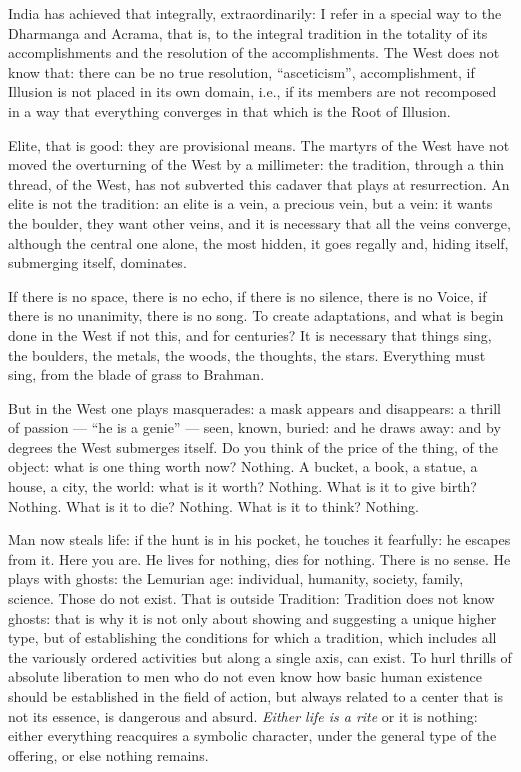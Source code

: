 India has achieved that integrally, extraordinarily: I refer in a special way to the Dharmanga and Acrama, that is, to the integral tradition in the totality of its accomplishments and the resolution of the accomplishments. The West does not know that: there can be no true resolution, ``asceticism'', accomplishment, if Illusion is not placed in its own domain, i.e., if its members are not recomposed in a way that everything converges in that which is the Root of Illusion.

Elite, that is good: they are provisional means. The martyrs of the West have not moved the overturning of the West by a millimeter: the tradition, through a thin thread, of the West, has not subverted this cadaver that plays at resurrection. An elite is not the tradition: an elite is a vein, a precious vein, but a vein: it wants the boulder, they want other veins, and it is necessary that all the veins converge, although the central one alone, the most hidden, it goes regally and, hiding itself, submerging itself, dominates.

If there is no space, there is no echo, if there is no silence, there is no Voice, if there is no unanimity, there is no song. To create adaptations, and what is begin done in the West if not this, and for centuries? It is necessary that things sing, the boulders, the metals, the woods, the thoughts, the stars. Everything must sing, from the blade of grass to Brahman.

But in the West one plays masquerades: a mask appears and disappears: a thrill of passion --- ``he is a genie'' --- seen, known, buried: and he draws away: and by degrees the West submerges itself. Do you think of the price of the thing, of the object: what is one thing worth now? Nothing. A bucket, a book, a statue, a house, a city, the world: what is it worth? Nothing. What is it to give birth? Nothing. What is it to die? Nothing. What is it to think? Nothing.

Man now steals life: if the hunt is in his pocket, he touches it fearfully: he escapes from it. Here you are. He lives for nothing, dies for nothing. There is no sense. He plays with ghosts: the Lemurian age: individual, humanity, society, family, science. Those do not exist. That is outside Tradition: Tradition does not know ghosts: that is why it is not only about showing and suggesting a unique higher type, but of establishing the conditions for which a tradition, which includes all the variously ordered activities but along a single axis, can exist. To hurl thrills of absolute liberation to men who do not even know how basic human existence should be established in the field of action, but always related to a center that is not its essence, is dangerous and absurd. \emph{Either life is a rite} or it is nothing: either everything reacquires a symbolic character, under the general type of the offering, or else nothing remains.

